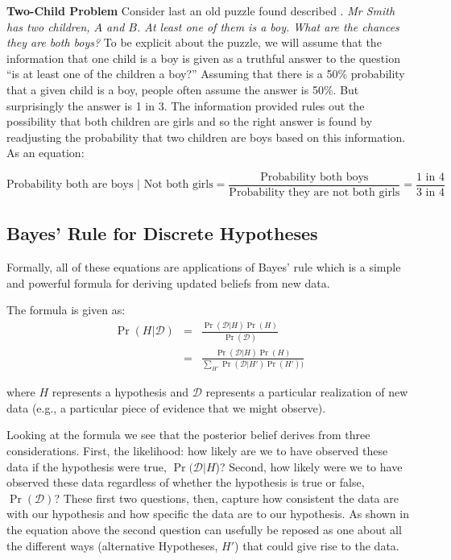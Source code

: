 \documentclass[12pt,]{book}
\begin{document}
\textbf{Two-Child Problem} Consider last an old puzzle found described \citet{gardner1961second}. \emph{Mr Smith has two children, \(A\) and \(B\). At least one of them is a boy. What are the chances they are both boys?}
To be explicit about the puzzle, we will assume that the information that one child is a boy is given as a truthful answer to the question ``is at least one of the children a boy?'' Assuming that there is a 50\% probability that a given child is a boy, people often assume the answer is 50\%. But surprisingly the answer is 1 in 3. The information provided rules out the possibility that both children are girls and so the right answer is found by readjusting the probability that two children are boys based on this information. As an equation:

\[\text{Probability both are boys | Not both girls} = \frac{\text{Probability  both boys}}{\text{Probability they are not both girls}} = \frac{\text{1 in 4}}{\text{3 in 4}}\]

\hypertarget{bayes-rule-for-discrete-hypotheses}{%
\subsection{Bayes' Rule for Discrete Hypotheses}\label{bayes-rule-for-discrete-hypotheses}}

Formally, all of these equations are applications of Bayes' rule which is a simple and powerful formula for deriving updated beliefs from new data.

The formula is given as:
\begin{eqnarray}
\Pr(H|\mathcal{D})&=&\frac{\Pr(\mathcal{D}|H)\Pr(H)}{\Pr(\mathcal{D})}\\
                  &=&\frac{\Pr(\mathcal{D}|H)\Pr(H)}{\sum_{H'}\Pr(\mathcal{D}|H')\Pr(H'))}
\end{eqnarray}

where \(H\) represents a hypothesis and \(\mathcal{D}\) represents a particular realization of new data (e.g., a particular piece of evidence that we might observe).

Looking at the formula we see that the posterior belief derives from three considerations. First, the likelihood: how likely are we to have observed these data if the hypothesis were true, \(\Pr(\mathcal{D}|H\))? Second, how likely were we to have observed these data regardless of whether the hypothesis is true or false, \(\Pr(\mathcal{D})\)? These first two questions, then, capture how consistent the data are with our hypothesis and how specific the data are to our hypothesis. As shown in the equation above the second question can usefully be reposed as one about all the different ways (alternative Hypotheses, \(H'\)) that could give rise to the data.
\end{document}

